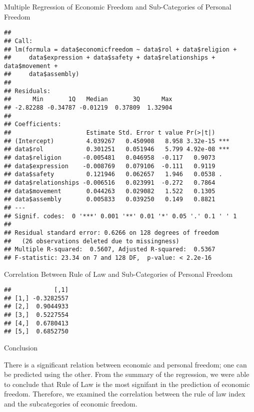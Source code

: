 \documentclass[ignorenonframetext,]{beamer}
\begin{document}
\begin{frame}[fragile]{Multiple Regression of Economic Freedom and
Sub-Categories of Personal Freedom}
\protect\hypertarget{multiple-regression-of-economic-freedom-and-sub-categories-of-personal-freedom}{}

\begin{verbatim}
## 
## Call:
## lm(formula = data$economicfreedom ~ data$rol + data$religion + 
##     data$expression + data$safety + data$relationships + data$movement + 
##     data$assembly)
## 
## Residuals:
##      Min       1Q   Median       3Q      Max 
## -2.82288 -0.34787 -0.01219  0.37809  1.32904 
## 
## Coefficients:
##                     Estimate Std. Error t value Pr(>|t|)    
## (Intercept)         4.039267   0.450908   8.958 3.32e-15 ***
## data$rol            0.301251   0.051946   5.799 4.92e-08 ***
## data$religion      -0.005481   0.046958  -0.117   0.9073    
## data$expression    -0.008769   0.079106  -0.111   0.9119    
## data$safety         0.121946   0.062657   1.946   0.0538 .  
## data$relationships -0.006516   0.023991  -0.272   0.7864    
## data$movement       0.044263   0.029082   1.522   0.1305    
## data$assembly       0.005833   0.039250   0.149   0.8821    
## ---
## Signif. codes:  0 '***' 0.001 '**' 0.01 '*' 0.05 '.' 0.1 ' ' 1
## 
## Residual standard error: 0.6266 on 128 degrees of freedom
##   (26 observations deleted due to missingness)
## Multiple R-squared:  0.5607, Adjusted R-squared:  0.5367 
## F-statistic: 23.34 on 7 and 128 DF,  p-value: < 2.2e-16
\end{verbatim}

\end{frame}

\begin{frame}[fragile]{Correlation Between Rule of Law and
Sub-Categories of Personal Freedom}
\protect\hypertarget{correlation-between-rule-of-law-and-sub-categories-of-personal-freedom}{}

\begin{verbatim}
##            [,1]
## [1,] -0.3282557
## [2,]  0.9044933
## [3,]  0.5227554
## [4,]  0.6780413
## [5,]  0.6852750
\end{verbatim}

\end{frame}

\begin{frame}{Conclusion}
\protect\hypertarget{conclusion}{}

There is a significant relation between economic and personal freedom;
one can be predicted using the other. From the summary of the
regression, we were able to conclude that Rule of Law is the most
signifant in the prediction of economic freedom. Therefore, we examined
the correlation between the rule of law index and the subcategories of
economic freedom.

\end{frame}
\end{document}
